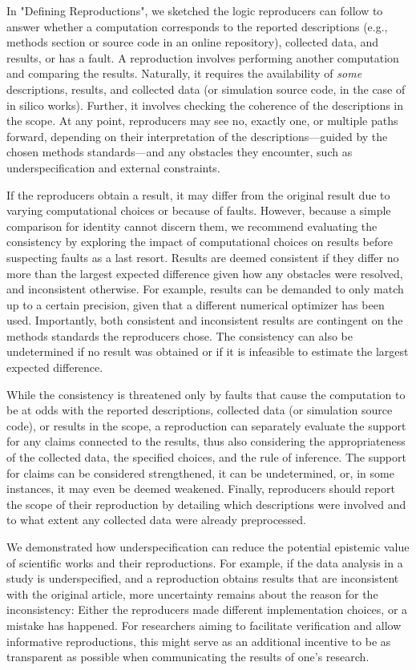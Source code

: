 \documentclass[authordate, meta]{jote-new-article}
\begin{document}
	In "Defining Reproductions", we sketched the logic reproducers can follow to answer whether a computation corresponds to the reported descriptions (e.g., methods section or source code in an online repository), collected data, and results, or has a fault. A reproduction involves performing another computation and comparing the results. Naturally, it requires the availability of \emph{some} descriptions, results, and collected data (or simulation source code, in the case of in silico works). Further, it involves checking the coherence of the descriptions in the scope. At any point, reproducers may see no, exactly one, or multiple paths forward, depending on their interpretation of the descriptions—guided by the chosen methods standards—and any obstacles they encounter, such as underspecification and external constraints.


	If the reproducers obtain a result, it may differ from the original result due to varying computational choices or because of faults. However, because a simple comparison for identity cannot discern them, we recommend evaluating the consistency by exploring the impact of computational choices on results before suspecting faults as a last resort. Results are deemed consistent if they differ no more than the largest expected difference given how any obstacles were resolved, and inconsistent otherwise. For example, results can be demanded to only match up to a certain precision, given that a different numerical optimizer has been used. Importantly, both consistent and inconsistent results are contingent on the methods standards the reproducers chose. The consistency can also be undetermined if no result was obtained or if it is infeasible to estimate the largest expected difference.


	While the consistency is threatened only by faults that cause the computation to be at odds with the reported descriptions, collected data (or simulation source code), or results in the scope, a reproduction can separately evaluate the support for any claims connected to the results, thus also considering the appropriateness of the collected data, the specified choices, and the rule of inference. The support for claims can be considered strengthened, it can be undetermined, or, in some instances, it may even be deemed weakened. Finally, reproducers should report the scope of their reproduction by detailing which descriptions were involved and to what extent any collected data were already preprocessed.


	We demonstrated how underspecification can reduce the potential epistemic value of scientific works and their reproductions. For example, if the data analysis in a study is underspecified, and a reproduction obtains results that are inconsistent with the original article, more uncertainty remains about the reason for the inconsistency: Either the reproducers made different implementation choices, or a mistake has happened. For researchers aiming to facilitate verification and allow informative reproductions, this might serve as an additional incentive to be as transparent as possible when communicating the results of one's research.
\end{document}
